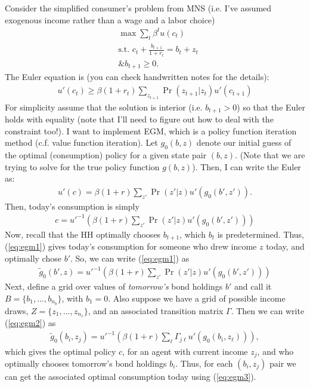 \documentclass[12pt]{article}
\begin{document}
Consider the simplified consumer's problem from MNS (i.e. I've assumed exogenous income rather than a wage and a labor choice)
\begin{align*}
&\max \sum_t \beta^t u(c_t) \\
&\text{s.t. } c_t + \frac{b_{t+1}}{1+r_t} = b_t + z_t\\
&\text{\& } b_{t+1} \geq 0.
\end{align*}
The Euler equation is (you can check handwritten notes for the details):
\begin{align*}
u'(c_t) \geq \beta(1+r_t) \sum_{z_{t+1}}\Pr(z_{t+1}|z_t)u'(c_{t+1})
\end{align*}
For simplicity assume that the solution is interior (i.e. $b_{t+1} > 0$) so that the Euler holds with equality (note that I'll need to figure out how to deal with the constraint too!). I want to implement EGM, which is a policy function iteration method (c.f. value function iteration). Let $g_0(b,z)$ denote our initial guess of the optimal (consumption) policy for a given state pair $(b,z)$. (Note that we are trying to solve for the true policy function $g(b,z)$). Then, I can write the Euler as:
\begin{align*}
u'(c) = \beta(1+r) \sum_{z'}\Pr(z'|z)u'(g_0(b',z')).
\end{align*}
Then, today's consumption is simply
\begin{align}
c = u'^{-1}\left( \beta(1+r) \sum_{z'}\Pr(z'|z)u'(g_0(b',z'))\right) \label{eq:egm1}
\end{align}
Now, recall that the HH optimally chooses $b_{t+1}$, which $b_t$ is predetermined. Thus, (\ref{eq:egm1}) gives today's consumption for someone who drew income $z$ today, and optimally chose $b'$. So, we can write (\ref{eq:egm1}) as
\begin{align}
\tilde g_0(b',z) = u'^{-1}\left( \beta(1+r) \sum_{z'}\Pr(z'|z)u'(g_0(b',z'))\right)  \label{eq:egm2}
\end{align}
Next, define a grid over values of \textit{tomorrow's} bond holdings $b'$ and call it $B = \{b_1, ...,b_{n_b}\}$, with $b_1 = 0$. Also suppose we have a grid of possible income draws, $Z=\{z_1, ..., z_{n_z}\}$, and an associated transition matrix $\Gamma$. Then we can write (\ref{eq:egm2}) as
\begin{align}
\tilde g_0(b_i,z_j) = u'^{-1}\left( \beta(1+r) \sum_{\ell}\Gamma_{j\ell} u'(g_0(b_i, z_\ell))\right) \label{eq:egm3}, 
\end{align}
which gives the optimal policy $c$, for an agent with current income $z_j$, and who optimally chooses tomorrow's bond holdings $b_i$. Thus, for each $(b_i, z_j)$ pair we can get the associated optimal consumption today using (\ref{eq:egm3}).\\
\end{document}
